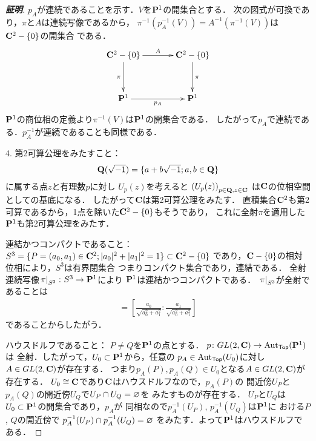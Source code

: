 \begin{proof}[\textbf{証明}]
    $p_A$が連続であることを示す．$V$を$\mathbf{P}^1$の開集合とする．
    次の図式が可換であり，$\pi$と$A$は連続写像であるから，
    $\pi^{-1}\left(p_A^{-1}(V)\right)
    =A^{-1}\left(\pi^{-1}(V)\right)$は$\mathbf{C}^2-\{0\}$の開集合
    である．
    \begin{equation*}
        \vcenter{\xymatrix@C=36pt@R=36pt{
        \cc^2-\{0\} 
        \ar@{{}->}[d]_{\pi} 
        \ar@{{}->}[r]^-{A} 
        & \cc^2-\{0\} 
        \ar@{{}->}[d]^{\pi} 
        \\
        \pp^1 \ar[r]_{p_A}  
        & \pp^1 \ar@{}[lu]
        }}
    \end{equation*}
    $\mathbf{P}^{1}$の商位相の定義より$\pi^{-1}(V)$は$\mathbf{P}^{1}$の開集合である．
    したがって$p_A$で連続である．$p_A^{-1}$が連続であることも同様である．

    4. 
    第2可算公理をみたすこと：
    \begin{align*}
        \mathbf{Q}(\sqrt{-1})=\{a+b\sqrt{-1};a,b\in\mathbf{Q}\}
    \end{align*}
    に属する点$z$と有理数$p$に対し
    $U_{p}(z)$を考えると
    $\left(U_{p}(z)\right)_{p\in\mathbf{Q},z\in\mathbf{C}}$
    は$\mathbf{C}$の位相空間としての基底になる．
    したがって$\mathbf{C}$は第2可算公理をみたす．
    直積集合$\mathbf{C}^2$も第2可算であるから，1点を除いた$\mathbf{C}^2-\{0\}$もそうであり，
    これに全射$\pi$を適用した$\mathbf{P}^1$も第2可算公理をみたす．

    連結かつコンパクトであること：
    $S^3=\{P=(a_0,a_1)\in\mathbf{C}^2;|a_0|^2+|a_1|^2=1\}\subset\mathbf{C}^2-\{0\}$
    であり，$\mathbf{C}-\{0\}$の相対位相により，$S^3$は有界閉集合
    つまりコンパクト集合であり，連結である．
    全射連続写像$\left. \pi \right|_{S^3}\colon S^3\to\mathbf{P}^1$により 
    $\mathbf{P}^1$は連結かつコンパクトである．
    $\left. \pi \right|_{S^3}$が全射であることは
    \begin{align*}
        [a_0\colon a_1]
        =
        \left[
            \frac{a_0}{\sqrt{a_0^2+a_1^2}}\colon \frac{a_1}{\sqrt{a_0^2+a_1^2}}
        \right]
    \end{align*}
    であることからしたがう．

    ハウスドルフであること：
    $P\neq Q$を$\mathbf{P}^1$の点とする．
    $p\colon GL(2,\mathbf{C})\to \mathop{\mathrm{Aut}}\nolimits_{\textsf{Top}}(\mathbf{P}^1)$は
    全射．したがって，$U_0\subset \mathbf{P}^1$から，任意の
    $p_{A}\in \mathop{\mathrm{Aut}}\nolimits_{\textsf{Top}}(U_0)$に対し$A\in GL(2,\mathbf{C})$が存在する．
    つまり$p_A(P),p_A(Q)\in U_0$となる$A\in GL(2,\mathbf{C})$が存在する．
    $U_0\cong \mathbf{C}$であり$\mathbf{C}$はハウスドルフなので，$p_A(P)$の
    開近傍$U_P$と$p_A(Q)$の開近傍$U_Q$で$U_P\cap U_Q=\varnothing$を
    みたすものが存在する．
    $U_P$と$U_Q$は$U_0\subset\mathbf{P}^1$の開集合であり，$p_{A}$が
    同相なので$p_A^{-1}(U_P)$, $p_A^{-1}(U_Q)$は$\mathbf{P}^1$に
    おける$P$, $Q$の開近傍で
    $p_A^{-1}(U_P)\cap p_A^{-1}(U_Q)=\varnothing$
    をみたす．よって$\mathbf{P}^1$はハウスドルフである．
\end{proof}

